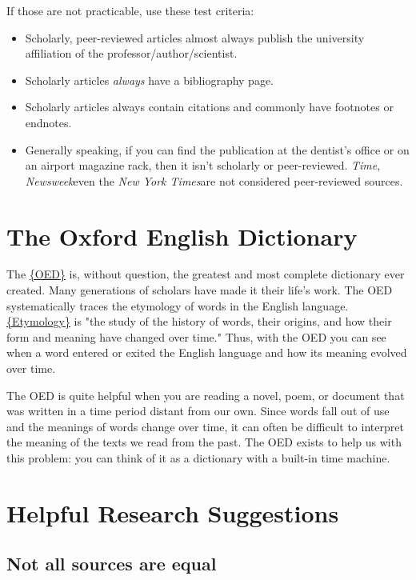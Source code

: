 {If those are not practicable, use these test criteria:
\begin{itemize}
\item Scholarly, peer-reviewed articles almost always publish the university 
affiliation of the professor/author/scientist. 

\item Scholarly articles \emph{always} have a bibliography page. 

\item Scholarly articles always contain citations and commonly have footnotes 
or endnotes. 

\item Generally speaking, if you can find the publication at the dentist's 
office or on an airport magazine rack, then it isn't scholarly or 
peer-reviewed. \emph{Time}, \emph{Newsweek}\textemdash even the \emph{New York 
Times}\textemdash are not considered peer-reviewed sources.
\end{itemize}

\section{The Oxford English Dictionary}

The \href{http://www.oed.com.ezproxy.bu.edu}{\{OED\}} is, without question, the 
greatest and most complete dictionary ever created. Many generations of 
scholars have made it their life's work. The OED systematically traces the 
etymology of words in the English language. 
\href{http://en.wikipedia.org/wiki/Etymology}{\{Etymology\}} is "the study of 
the history of words, their origins, and how their form and meaning have 
changed over time." Thus, with the OED you can see when a word entered or 
exited the English language and how its meaning evolved over time. 

The OED is quite helpful when you are reading a novel, poem, or document that 
was written in a time period distant from our own. Since words fall out of use 
and the meanings of words change over time, it can often be difficult to 
interpret the meaning of the texts we read from the past. The OED exists to 
help us with this problem: you can think of it as a dictionary with a built-in 
time machine. 


\section{Helpful Research Suggestions}

\subsection{Not all sources are equal}

}
